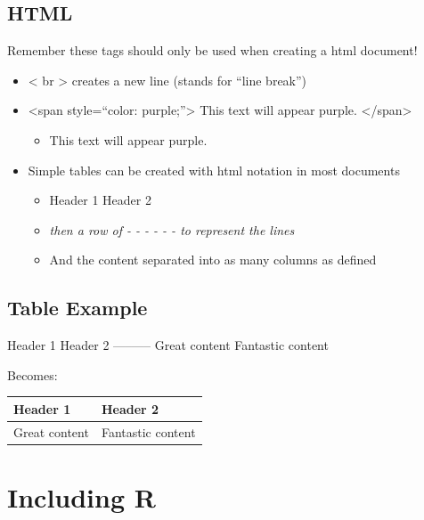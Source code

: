 \documentclass[
]{book}
\providecommand{\tightlist}{%
  \setlength{\itemsep}{0pt}\setlength{\parskip}{0pt}}
\begin{document}
\subsection{HTML}\label{html}

Remember these tags should only be used when creating a html document!

\begin{itemize}
\tightlist
\item
  \textless{} br \textgreater{} creates a new line (stands for ``line break'')
\item
  \textless span style=``color: purple;''\textgreater{} This text will appear purple. \textless/span\textgreater{}

  \begin{itemize}
  \tightlist
  \item
    { This text will appear purple. }
  \end{itemize}
\item
  Simple tables can be created with html notation in most documents

  \begin{itemize}
  \tightlist
  \item
    Header 1 \textbar{} Header 2
  \item
    \emph{then a row of - - - \textbar{} - - - to represent the lines}
  \item
    And the content separated \textbar{} into as many columns as defined
  \end{itemize}
\end{itemize}

\subsection{Table Example}\label{table-example}

Header 1 \textbar{} Header 2
-----\textbar-----
Great content \textbar{} Fantastic content

Becomes:

\begin{longtable}[]{@{}ll@{}}
\toprule\noalign{}
Header 1 & Header 2 \\
\midrule\noalign{}
\endhead
\bottomrule\noalign{}
\endlastfoot
Great content & Fantastic content \\
\end{longtable}

\section{Including R}\label{including-r}
\end{document}
